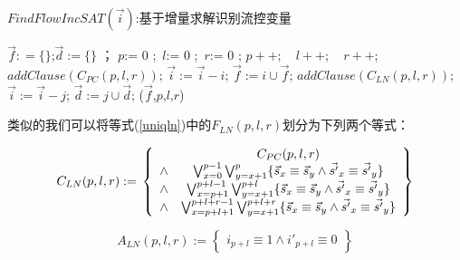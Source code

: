 \begin{algorithm}[b]
\caption{$FindFlowIncSAT(\vec{i})$:基于增量求解识别流控变量}
\label{alg_fofc_inc}
\begin{algorithmic}[1]
\STATE $\vec{f}: = \{\}$;$\vec{d}:= \{\}$ \label{initfd2}；
\STATE $p$:= 0 ;~$l$:= 0 ;~$r$:= 0 \label{initplr2};
\STATE {}\label{while2}
\STATE  $p++$; ~ $l++$; ~ $r++$;
\STATE  $addClause(C_{PC}(p,l,r))$\label{addcls21};
  \label{solve21}
      \label{adduniq2}
      \STATE $\vec{i}:= \vec{i}-i$;
      \STATE $\vec{f}:= i\cup\vec{f}$;
    \ENDIF
  \ENDFOR
  \STATE $addClause(C_{LN}(p,l,r))$\label{addcls22};
     \label{solve22}
      \label{adduniq3}
       \label{ruleout2}
	  \STATE $\vec{i}:=\vec{i}-j$;
	  \STATE $\vec{d}:=j\cup\vec{d}$;
	   \ENDIF
      \ENDFOR
    \ENDIF
  \ENDFOR
\ENDWHILE
\RETURN ($\vec{f}$,$p$,$l$,$r$)
\end{algorithmic}
\end{algorithm}

类似的我们可以将等式(\ref{uniqln})中的$F_{LN}(p,l,r)$划分为下列两个等式：

\begin{equation}\label{uniqln_f}
C_{LN}(p,l,r):=\\
\left\{
\begin{array}{cc}
&C_{PC}(p,l,r)\\
\wedge&\bigvee_{x=0}^{p-1}\bigvee_{y=x+1}^{p} \{\vec{s}_x\equiv \vec{s}_y\wedge \vec{s'}_x\equiv \vec{s'}_y\} \\
\wedge&\bigvee_{x=p+1}^{p+l-1}\bigvee_{y=x+1}^{p+l} \{\vec{s}_x\equiv \vec{s}_y\wedge \vec{s'}_x\equiv \vec{s'}_y\} \\
\wedge&\bigvee_{x=p+l+1}^{p+l+r-1}\bigvee_{y=x+1}^{p+l+r} \{\vec{s}_x\equiv \vec{s}_y\wedge \vec{s'}_x\equiv \vec{s'}_y\}
\end{array}
\right\}
\end{equation}

\begin{equation}\label{uniqln_a}
A_{LN}(p,l,r):=
\left\{
\begin{array}{c}
 i_{p+l}\equiv 1 \wedge  i'_{p+l}\equiv 0
\end{array}
\right\}
\end{equation}



